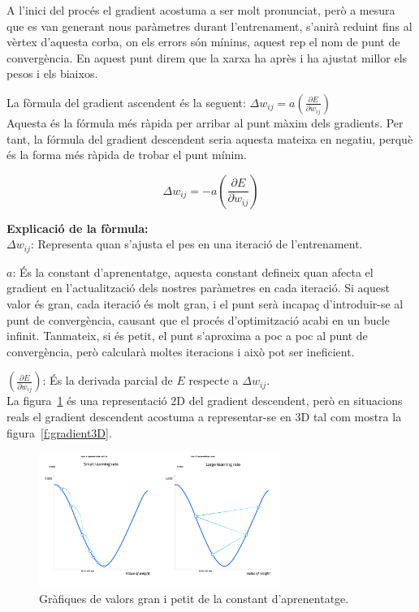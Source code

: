           A l'inici del procés el gradient acostuma a ser molt pronunciat, però a mesura que es van generant nous paràmetres durant l'entrenament, s'anirà reduint fins al vèrtex d'aquesta corba, on els errors són mínims, aquest rep el nom de punt de convergència. En aquest punt direm que la xarxa ha après i ha ajustat millor els pesos i els biaixos.

          La fòrmula del gradient ascendent és la seguent: $\Delta w_{ij} = a \left( \frac{\partial E}{\partial w_{ij}} \right)$\\


          Aquesta és la fórmula més ràpida per arribar al punt màxim dels gradients. Per tant, la fórmula del gradient descendent seria aquesta mateixa en negatiu, perquè és la forma més ràpida de trobar el punt mínim.

          $$\Delta w_{ij} = -a \left( \frac{\partial E}{\partial w_{ij}} \right)$$

          \textbf{Explicació de la fòrmula:}\\

           $\Delta w_{ij}$: Representa quan s'ajusta el pes en una iteració de l'entrenament.

           $a$: És la constant d'aprenentatge, aquesta constant defineix quan afecta el gradient en l'actualització dels nostres paràmetres en cada iteració. Si aquest valor és gran, cada iteració és molt gran, i el punt serà incapaç d'introduir-se al punt de convergència, causant que el procés d'optimització acabi en un bucle infinit. Tanmateix, si és petit, el punt s'aproxima a poc a poc al punt de convergència, però calcularà moltes iteracions i això pot ser ineficient.

           $\left( \frac{\partial E}{\partial w_{ij}} \right)$: És la derivada parcial de $E$ respecte a $\Delta w_{ij}$. \\

           La figura~\ref{Gran i petit} és una representació 2D del gradient descendent, però en situacions reals el gradient descendent acostuma a representar-se en 3D tal com mostra la figura~\ref{f:gradient3D}.

    \begin{figure}[H]
    \centering
    \includegraphics[width=0.7\textwidth]{./figures/constant_gradient.png}
        \caption{Gràfiques de valors gran i petit de la constant d'aprenentatge.~\cite{Img_granpetit}}
        \label{Gran i petit}
    \end{figure}

